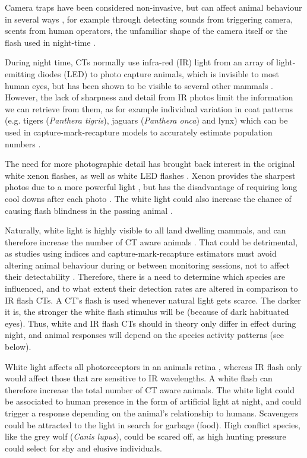 Camera traps have been considered non-invasive, but can affect animal behaviour in several ways \cite{Meek2014a}, for example through detecting sounds from triggering camera, scents from human operators, the unfamiliar shape of the camera itself or the flash used in night-time \autocite{Meek2014a, Burton2015, Beddari2019}. %


During night time, CTs normally use infra-red (IR) light from an array of light-emitting diodes (LED) to photo capture animals, which is invisible to most human eyes, but has been shown to be visible to several other mammals \autocite{Meek2014a, Meek2016}. 
However, the lack of sharpness and detail from IR photos limit the information we can retrieve from them, as for example individual variation in coat patterns (e.g. tigers (\textit{Panthera tigris}), jaguars (\textit{Panthera onca}) and lynx) which can be used in capture-mark-recapture models to accurately estimate population numbers \cite{Meek2014a,Rovero2013}. 

The need for more photographic detail has brought back interest in the original white xenon flashes, as well as white LED flashes \autocite{Rovero2013}.
Xenon provides the sharpest photos due to a more powerful light \cite{Rovero2013}, but has the disadvantage of requiring long cool downs after each photo \autocite{Henrich2020}.
The white light could also increase the chance of causing flash blindness in the passing animal \cite{Dryja2005}.

Naturally, white light is highly visible to all land dwelling mammals, and can therefore increase the number of CT aware animals \autocite{Glen2013a}.
That could be detrimental, as studies using indices and capture-mark-recapture estimators must avoid altering animal behaviour during or between monitoring sessions, not to affect their detectability \autocite{Meek2014a}.
Therefore, there is a need to determine which species are influenced, and to what extent their detection rates are altered in comparison to IR flash CTs.
A CT's flash is used whenever natural light gets scarce. 
The darker it is, the stronger the white flash stimulus will be (because of dark habituated eyes).
Thus, white and IR flash CTs should in theory only differ in effect during night, and animal responses will depend on the species activity patterns (see below). 



White light affects all photoreceptors in an animals retina \autocite{Dryja2005}, whereas IR flash only would affect those that are sensitive to IR wavelengths. 
A white flash can therefore increase the total number of CT aware animals.
The white light could be associated to human presence in the form of artificial light at night, and could trigger a response depending on the animal's relationship to humans.
Scavengers could be attracted to the light in search for garbage (food).
High conflict species, like the grey wolf (\textit{Canis lupus}), could be scared off, as high hunting pressure could select for shy and elusive individuals.

